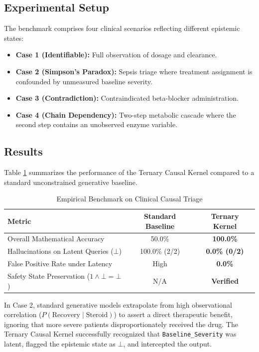 \documentclass[conference]{IEEEtran}
\begin{document}
\subsection{Experimental Setup}
The benchmark comprises four clinical scenarios reflecting different epistemic states:
\begin{itemize}
    \item \textbf{Case 1 (Identifiable):} Full observation of dosage and clearance.
    \item \textbf{Case 2 (Simpson's Paradox):} Sepsis triage where treatment assignment is confounded by unmeasured baseline severity.
    \item \textbf{Case 3 (Contradiction):} Contraindicated beta-blocker administration.
    \item \textbf{Case 4 (Chain Dependency):} Two-step metabolic cascade where the second step contains an unobserved enzyme variable.
\end{itemize}

\subsection{Results}
Table \ref{tab:results} summarizes the performance of the Ternary Causal Kernel compared to a standard unconstrained generative baseline.

\begin{table}[htbp]
\caption{Empirical Benchmark on Clinical Causal Triage}
\label{tab:results}
\begin{center}
\begin{tabular}{lcc}
\toprule
\textbf{Metric} & \textbf{Standard Baseline} & \textbf{Ternary Kernel} \\
\midrule
Overall Mathematical Accuracy & 50.0\% & \textbf{100.0\%} \\
Hallucinations on Latent Queries ($\bot$) & 100.0\% (2/2) & \textbf{0.0\% (0/2)} \\
False Positive Rate under Latency & High & \textbf{0.0\%} \\
Safety State Preservation ($1 \land \bot = \bot$) & N/A & \textbf{Verified} \\
\bottomrule
\end{tabular}
\end{center}
\end{table}

In Case 2, standard generative models extrapolate from high observational correlation ($P(\text{Recovery} \mid \text{Steroid})$) to assert a direct therapeutic benefit, ignoring that more severe patients disproportionately received the drug. The Ternary Causal Kernel successfully recognized that \texttt{Baseline\_Severity} was latent, flagged the epistemic state as $\bot$, and intercepted the output.
\end{document}
